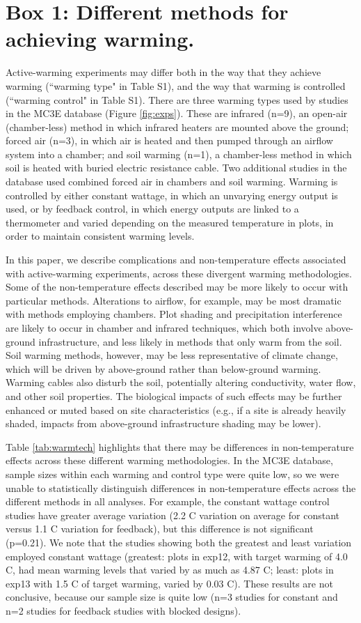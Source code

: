 \documentclass{article}
\begin{document}
\section* {Box 1: Different methods for achieving warming.}
Active-warming experiments may differ both in the way that they achieve warming (``warming type" in Table S1), and the way that warming is controlled (``warming control" in Table S1). There are three warming types used by studies in the MC3E database (Figure \ref{fig:exps}). These are infrared (n=9), an open-air (chamber-less) method in which infrared heaters are mounted above the ground; forced air (n=3), in which air is heated and then pumped through an airflow system into a chamber; and soil warming (n=1), a chamber-less method in which soil is heated with buried electric resistance cable. Two additional studies in the database used combined forced air in chambers and soil warming. Warming is controlled by either constant wattage, in which an unvarying energy output is used, or by feedback control, in which energy outputs are linked to a thermometer and varied depending on the measured temperature in plots, in order to maintain consistent warming levels. 
\par In this paper, we describe complications and non-temperature effects associated with active-warming experiments, across these divergent warming methodologies. Some of the non-temperature effects described may be more likely to occur with particular methods. Alterations to airflow, for example, may be most dramatic with methods employing chambers. Plot shading and precipitation interference are likely to occur in chamber and infrared techniques, which both involve above-ground infrastructure, and less likely in methods that only warm from the soil. Soil warming methods, however, may be less representative of climate change, which will be driven by above-ground rather than below-ground warming. Warming cables also disturb the soil, potentially altering conductivity, water flow, and other soil properties. The biological impacts of such effects may be further enhanced or muted based on site characteristics (e.g., if a site is already heavily shaded, impacts from above-ground infrastructure shading may be lower).
\par Table \ref{tab:warmtech} highlights that there may be differences in non-temperature effects across these different warming methodologies. In the MC3E database, sample sizes within each warming and control type were quite low, so we were unable to statistically distinguish differences in non-temperature effects across the different methods in all analyses. For example, the constant wattage control studies have greater average variation (2.2 \degree C variation on average for constant versus 1.1 \degree C variation for feedback), but this difference is not significant (p=0.21). We note that the studies showing both the greatest and least variation employed constant wattage (greatest: plots in exp12, with target warming of 4.0 \degree C, had mean warming levels that varied by as much as 4.87 \degree C; least: plots in exp13 with 1.5 \degree C of target warming, varied by 0.03 \degree C). These results are not conclusive, because our sample size is quite low (n=3 studies for constant and n=2 studies for feedback studies with blocked designs).
\end{document}
